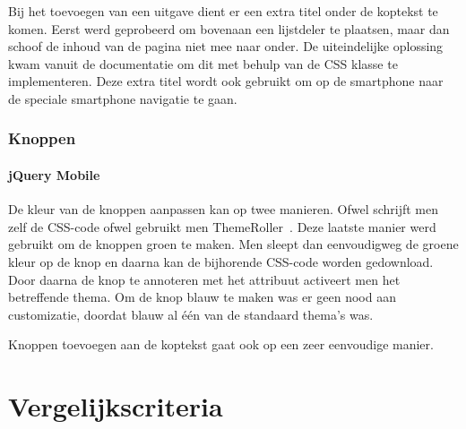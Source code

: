 Bij het toevoegen van een uitgave dient er een extra titel onder de koptekst te komen. Eerst werd geprobeerd om bovenaan een lijstdeler te plaatsen, maar dan schoof de inhoud van de pagina niet mee naar onder. De uiteindelijke oplossing kwam vanuit de documentatie \cite{JQuery2013b} om dit met behulp van de  CSS klasse te implementeren. Deze extra titel wordt ook gebruikt om op de smartphone naar de speciale smartphone navigatie te gaan.

\subsubsection{Knoppen}

\paragraph{jQuery Mobile} 
De kleur van de knoppen aanpassen kan op twee manieren. Ofwel schrijft men zelf de CSS-code ofwel gebruikt men ThemeRoller~\cite{JQuery2012c}. Deze laatste manier werd gebruikt om de knoppen groen te maken. Men sleept dan eenvoudigweg de groene kleur op de knop en daarna kan de bijhorende CSS-code worden gedownload. Door daarna de knop te annoteren met het  attribuut activeert men het betreffende thema. Om de knop blauw te maken was er geen nood aan customizatie, doordat blauw al één van de standaard thema's was.

Knoppen toevoegen aan de koptekst gaat ook op een zeer eenvoudige manier.


\section{Vergelijkscriteria}
\label{sec:evaluatie-criteria}